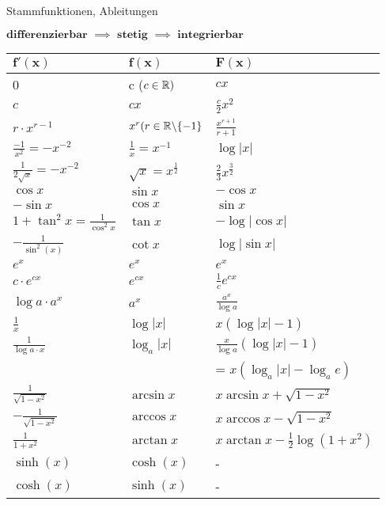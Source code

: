 \begin{Rechenregeln}{Stammfunktionen, Ableitungen}{}
    \begin{center}
        $\textbf{differenzierbar }\implies\textbf{ stetig }\implies \textbf{ integrierbar}$\\
    \end{center}
    \begin{longtable}{l|l|l}
        $\mathbf{f'(x)}$ & $\mathbf{f(x)}$ & $\mathbf{F(x)}$ \\[0.5em] \hline
        0 & c ($c\in\mathbb{R})$ & $cx$ \\[0.5em]
        $c$ & $cx$ &$\frac{c}{2}x^2$ \\[0.5em]
        $r\cdot x^{r-1}$ & $x^r (r\in \mathbb{R} \backslash \{-1\}$ & $\frac{x^{r+1}}{r+1}$ \\[0.5em]
        $\frac{-1}{x^2} = -x^{-2}$ & $\frac{1}{x}=x^{-1}$ & $\log |x| $ \\[0.5em]
        $\frac{1}{2 \sqrt{x}} = -x^{-2}$ & $\sqrt{x} = x^{\frac{1}{2}}$ & $\frac{2}{3}x^{\frac{3}{2}}$ \\[0.5em]
        $\cos x$ & $\sin x$  & $-\cos x$ \\[0.5em]
        $-\sin x$ & $\cos x$ & $\sin x$\\[0.5em]
        $1+\tan^2x = \frac{1}{\cos^2x}$ & $\tan x$ & $-\log|\cos x|$\\[0.5em]
        $-\frac{1}{\sin^2(x)}$ & $\cot x$ & $\log|\sin x|$\\[0.5em]
        $e^x$ & $e^x$ & $e^x$\\[0.5em]
        $c\cdot e^{cx}$ & $e^{cx}$ & $\frac{1}{c}e^{cx}$\\[0.5em]
        $\log a \cdot a^x$ & $a^x$ & $\frac{a^x}{\log a}$\\[0.5em]
        $\frac{1}{x}$ & $\log|x|$ & $x(\log|x|-1)$ \\[0.5em]
        $\frac{1}{\log a\cdot x}$ & $\log_a |x|$ & $\frac{x}{\log a}(\log|x|-1)$\\[0.5em]
         & & = $x(\log_a|x|-\log_ae)$\\[0.5em]
        $\frac{1}{\sqrt{1-x^2}}$ & $\arcsin x$ & $x\arcsin x + \sqrt{1-x^2}$\\[0.5em]
        $-\frac{1}{\sqrt{1-x^2}}$ & $\arccos x$ &  $x\arccos x - \sqrt{1-x^2}$\\[0.5em]
        $\frac{1}{1+x^2}$ & $\arctan x$ & $x\arctan x - \frac{1}{2}\log(1+x^2)$\\[0.5em]
        $\sinh(x)$ & $\cosh(x)$ & - \\[0.5em]
        $\cosh(x)$ & $\sinh(x)$ & -\\[0.5em]

\end{longtable}
\end{Rechenregeln}

